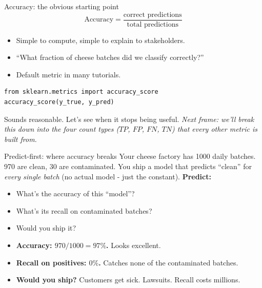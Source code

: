 \documentclass[aspectratio=169]{beamer}
\begin{document}
\begin{frame}[fragile]{Accuracy: the obvious starting point}
  \[
    \text{Accuracy} = \frac{\text{correct predictions}}{\text{total predictions}}
  \]
  \vfill
  \begin{itemize}
    \item Simple to compute, simple to explain to stakeholders.
    \item ``What fraction of cheese batches did we classify correctly?''
    \item Default metric in many tutorials.
  \end{itemize}
  \vfill
{\lstset{basicstyle=\ttfamily\scriptsize}
\begin{lstlisting}
from sklearn.metrics import accuracy_score
accuracy_score(y_true, y_pred)
\end{lstlisting}}
  \vfill
  \footnotesize Sounds reasonable. Let's see when it stops being useful. \emph{Next frame: we'll break this down into the four count types ($TP$, $FP$, $FN$, $TN$) that every other metric is built from.}
\end{frame}

\begin{frame}{Predict-first: where accuracy breaks}
  Your cheese factory has 1000 daily batches. 970 are clean, 30 are contaminated. You ship a model that predicts ``clean'' for \emph{every single batch} (no actual model - just the constant).
  \vfill
  \textbf{Predict:}
  \begin{itemize}
    \item What's the accuracy of this ``model''?
    \item What's its recall on contaminated batches?
    \item Would you ship it?
  \end{itemize}
  \vfill
  \begin{itemize}
    \item \textbf{Accuracy: $970 / 1000 = 97\%$.} Looks excellent.
    \item \textbf{Recall on positives: $0\%$.} Catches none of the contaminated batches.
    \item \textbf{Would you ship?} Customers get sick. Lawsuits. Recall costs millions.
  \end{itemize}
  \vfill
\end{frame}
\end{document}
